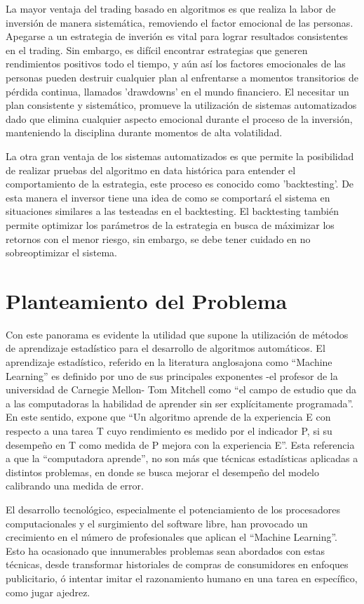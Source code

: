 \documentclass[a4paper,12pt]{Latex/Classes/PhDthesisPSnPDF}
\begin{document}
La mayor ventaja del trading basado en algoritmos es que realiza la labor de inversión de manera sistemática, removiendo el factor emocional de las personas. Apegarse a un estrategia de inverión es vital para lograr resultados consistentes en el trading. Sin embargo, es difícil encontrar estrategias que generen rendimientos positivos todo el tiempo, y aún así los factores emocionales de las personas pueden destruir cualquier plan al enfrentarse a momentos transitorios de pérdida continua, llamados 'drawdowns' en el mundo financiero. El necesitar un plan consistente y sistemático, promueve la utilización de sistemas automatizados dado que elimina cualquier aspecto emocional durante el proceso de la inversión, manteniendo la disciplina durante momentos de alta volatilidad.

La otra gran ventaja de los sistemas automatizados es que permite la posibilidad de realizar pruebas del algoritmo en data histórica para entender el comportamiento de la estrategia, este proceso es conocido como 'backtesting'. De esta manera el inversor tiene una idea de como se comportará el sistema en situaciones similares a las testeadas en el backtesting. El backtesting también permite optimizar los parámetros de la estrategia en busca de máximizar los retornos con el menor riesgo, sin embargo, se debe tener cuidado en no sobreoptimizar el sistema. 

\section{Planteamiento del Problema}

Con este panorama es evidente la utilidad que supone la utilización de métodos de aprendizaje estadístico para el desarrollo de algoritmos automáticos. El aprendizaje estadístico, referido en la literatura anglosajona como “Machine Learning” es definido por uno de sus principales exponentes -el profesor de la universidad de Carnegie Mellon- Tom Mitchell como “el campo de estudio que da a las computadoras la habilidad de aprender sin ser explícitamente programada”. En este sentido, expone que “Un algoritmo aprende de la experiencia E con respecto a una tarea T cuyo rendimiento es medido por el indicador P, si su desempeño en T como medida de P mejora con la experiencia E”. Esta referencia a que la “computadora aprende”, no son más que técnicas estadísticas aplicadas a distintos problemas, en donde se busca mejorar el desempeño del modelo calibrando una medida de error.

El desarrollo tecnológico, especialmente el potenciamiento de los procesadores computacionales y el surgimiento del software libre, han provocado un crecimiento en el número de profesionales que aplican el “Machine Learning”. Esto ha ocasionado que innumerables problemas sean abordados con estas técnicas, desde transformar historiales de compras de consumidores en enfoques publicitario, ó intentar imitar el razonamiento humano en una tarea en específico, como jugar ajedrez.
\end{document}
